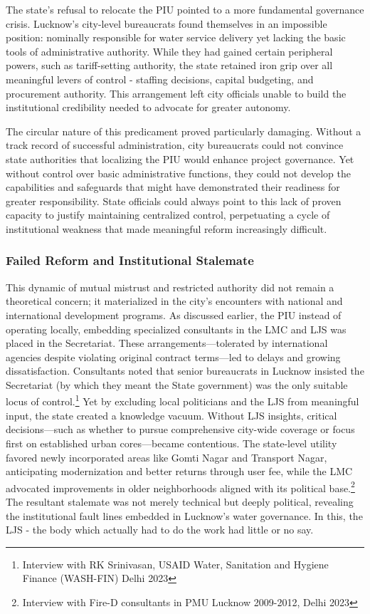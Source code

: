 The state's refusal to relocate the PIU pointed to a more fundamental governance crisis. Lucknow's city-level bureaucrats found themselves in an impossible position: nominally responsible for water service delivery yet lacking the basic tools of administrative authority. While they had gained certain peripheral powers, such as tariff-setting authority, the state retained iron grip over all meaningful levers of control - staffing decisions, capital budgeting, and procurement authority. This arrangement left city officials unable to build the institutional credibility needed to advocate for greater autonomy.

The circular nature of this predicament proved particularly damaging. Without a track record of successful administration, city bureaucrats could not convince state authorities that localizing the PIU would enhance project governance. Yet without control over basic administrative functions, they could not develop the capabilities and safeguards that might have demonstrated their readiness for greater responsibility. State officials could always point to this lack of proven capacity to justify maintaining centralized control, perpetuating a cycle of institutional weakness that made meaningful reform increasingly difficult.

\subsubsection{Failed Reform and Institutional Stalemate}

This dynamic of mutual mistrust and restricted authority did not remain a theoretical concern; it materialized in the city’s encounters with national and international development programs. As discussed earlier, the PIU instead of operating locally, embedding specialized consultants in the LMC and LJS was placed in the Secretariat. These arrangements—tolerated by international agencies despite violating original contract terms—led to delays and growing dissatisfaction. Consultants noted that senior bureaucrats in Lucknow insisted the Secretariat (by which they meant the State government) was the only suitable locus of control.\footnote{Interview with RK Srinivasan, USAID Water, Sanitation and Hygiene Finance (WASH-FIN) Delhi 2023} Yet by excluding local politicians and the LJS from meaningful input, the state created a knowledge vacuum. Without LJS insights, critical decisions—such as whether to pursue comprehensive city-wide coverage or focus first on established urban cores—became contentious. The state-level utility favored newly incorporated areas like Gomti Nagar and Transport Nagar, anticipating modernization and better returns through user fee, while the LMC advocated improvements in older neighborhoods aligned with its political base.\footnote{Interview with Fire-D consultants in PMU Lucknow 2009-2012, Delhi 2023} The resultant stalemate was not merely technical but deeply political, revealing the institutional fault lines embedded in Lucknow’s water governance. In this, the LJS - the body which actually had to do the work had little or no say. 

